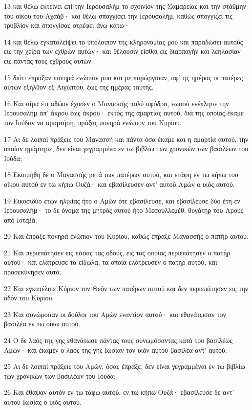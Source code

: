 \par 13 και θέλω εκτείνει επί την Ιερουσαλήμ το σχοινίον της Σαμαρείας και την στάθμην του οίκου του Αχαάβ· και θέλω σπογγίσει την Ιερουσαλήμ, καθώς σπογγίζει τις τρυβλίον και σπογγίσας στρέφει άνω κάτω·
\par 14 και θέλω εγκαταλείψει το υπόλοιπον της κληρονομίας μου και παραδώσει αυτούς εις την χείρα των εχθρών αυτών· και θέλουσιν είσθαι εις διαρπαγήν και λεηλασίαν εις πάντας τους εχθρούς αυτών·
\par 15 διότι έπραξαν πονηρά ενώπιόν μου και με παρώργισαν, αφ' ης ημέρας οι πατέρες αυτών εξήλθον εξ Αιγύπτου, έως της ημέρας ταύτης.
\par 16 Και αίμα έτι αθώον έχυσεν ο Μανασσής πολύ σφόδρα, εωσού ενέπλησε την Ιερουσαλήμ απ' άκρου έως άκρου· εκτός της αμαρτίας αυτού, διά της οποίας έκαμε τον Ιούδαν να αμαρτήση, πράξας πονηρά ενώπιον του Κυρίου.
\par 17 Αι δε λοιπαί πράξεις του Μανασσή και πάντα όσα έκαμε και η αμαρτία αυτού, την οποίαν ημάρτησε, δεν είναι γεγραμμένα εν τω βιβλίω των χρονικών των βασιλέων του Ιούδα;
\par 18 Εκοιμήθη δε ο Μανασσής μετά των πατέρων αυτού, και ετάφη εν τω κήπω του οίκου αυτού εν τω κήπω Ουζά· και εβασίλευσεν αντ' αυτού Αμών ο υιός αυτού.
\par 19 Εικοσιδύο ετών ηλικίας ήτο ο Αμών ότε εβασίλευσε, και εβασίλευσε δύο έτη εν Ιερουσαλήμ· το δε όνομα της μητρός αυτού ήτο Μεσουλλεμέθ, θυγάτηρ του Αρούς από Ιοτεβά.
\par 20 Και έπραξε πονηρά ενώπιον του Κυρίου, καθώς έπραξε Μανασσής ο πατήρ αυτού.
\par 21 Και περιεπάτησεν εις πάσας τας οδούς, εις τας οποίας περιεπάτησεν ο πατήρ αυτού· και ελάτρευσε τα είδωλα, τα οποία ελάτρευσεν ο πατήρ αυτού, και προσεκύνησεν αυτά.
\par 22 Και εγκατέλιπε Κύριον τον Θεόν των πατέρων αυτού και δεν περιεπάτησεν εις την οδόν του Κυρίου.
\par 23 Και συνώμοσαν οι δούλοι του Αμών εναντίον αυτού· και εθανάτωσαν τον βασιλέα εν τω οίκω αυτού.
\par 24 Ο δε λαός της γης εθανάτωσε πάντας τους συνωμόσαντας κατά του βασιλέως Αμών· και έκαμεν ο λαός της γης Ιωσίαν τον υιόν αυτού βασιλέα αντ' αυτού.
\par 25 Αι δε λοιπαί πράξεις του Αμών, όσας έπραξε, δεν είναι γεγραμμέναι εν τω βιβλίω των χρονικών των βασιλέων του Ιούδα;
\par 26 Και έθαψαν αυτόν εν τω τάφω αυτού, εν τω κήπω Ουζά· εβασίλευσε δε αντ' αυτού Ιωσίας ο υιός αυτού.

